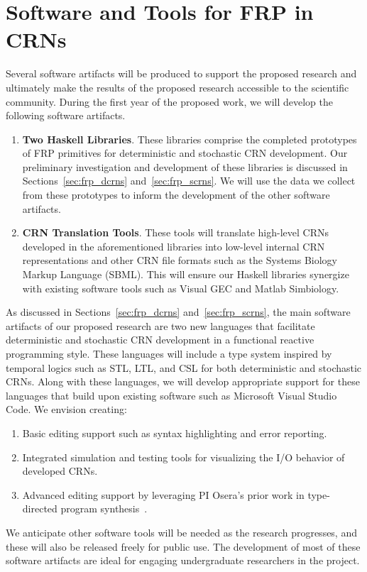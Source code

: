
\section{Software and Tools for FRP in CRNs}
\label{sec:software_support}

Several software artifacts will be produced to support the proposed research and ultimately make the results of the proposed research accessible to the scientific community.
During the first year of the proposed work, we will develop the following software artifacts.
\begin{enumerate}[nosep]
	\item \textbf{Two Haskell Libraries}.
    These libraries comprise the completed prototypes of FRP primitives for deterministic and stochastic CRN development.
	Our preliminary investigation and development of these libraries is discussed in Sections~\ref{sec:frp_dcrns} and~\ref{sec:frp_scrns}.
	We will use the data we collect from these prototypes to inform the development of the other software artifacts.
	
	\item \textbf{CRN Translation Tools}.
    These tools will translate high-level CRNs developed in the aforementioned libraries into low-level internal CRN representations and other CRN file formats such as the Systems Biology Markup Language (SBML).
	This will ensure our Haskell libraries synergize with existing software tools such as Visual GEC and Matlab Simbiology.
\end{enumerate}

As discussed in Sections~\ref{sec:frp_dcrns} and~\ref{sec:frp_scrns}, the main software artifacts of our proposed research are two new languages that facilitate deterministic and stochastic CRN development in a functional reactive programming style.
These languages will include a type system inspired by temporal logics such as STL, LTL, and CSL for both deterministic and stochastic CRNs.
Along with these languages, we will develop appropriate support for these languages that build upon existing software such as Microsoft Visual Studio Code.
We envision creating:
\begin{enumerate}[nosep]
	\item Basic editing support such as syntax highlighting and error reporting.
	\item Integrated simulation and testing tools for visualizing the I/O behavior of developed CRNs.
  \item Advanced editing support by leveraging PI Osera's prior work in type-directed program synthesis~\cite{osera:thesis:2015, osera:pldi:2015, frankle:popl:2015, osera:tyde:2019}.
\end{enumerate}

We anticipate other software tools will be needed as the research progresses, and these will also be released freely for public use.
The development of most of these software artifacts are ideal for engaging undergraduate researchers in the project.
